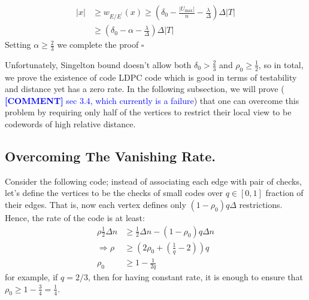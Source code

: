 \documentclass{article}
\newcommand{\commentt}[1]{\textcolor{blue}{ \textbf{[COMMENT]} #1}}
\newcommand{\ctt}[1]{\commentt{#1}}
\begin{document}
\begin{multicols*}{2}
  \begin{equation*}
    \begin{split}
      |x| & \ge  w_{E/E^{\prime}}\left( x \right)  \ge \left( \delta_{0} - \frac{|U_{\max}|}{n} - \frac{\lambda}{\Delta} \right) \Delta|T| \\ 
      & \ge \left( \delta_{0} - \alpha - \frac{\lambda}{\Delta} \right) \Delta|T| 
    \end{split}
  \end{equation*}
  Setting $\alpha \ge \frac{2}{3}$ we complete the proof $\square$

  Unfortunately, Singelton bound doesn't allow both $\delta_0 > \frac{2}{3}$ and $\rho_0 \ge \frac{1}{2}$, so in total, we prove the existence of code LDPC code which is good in terms of testability and distance yet has a zero rate. In the following subsection, we will prove (\ctt{sec 3.4, which currently is a failure}) that one can overcome this problem by requiring only half of the vertices to restrict their local view to be codewords of high relative distance. 


  \subsection { Overcoming The Vanishing Rate. } 
  Consider the following code; instead of associating each edge with pair of checks, let's define the vertices to be the checks of small codes over $q \in [0,1]$ fraction of their edges. That is, now each vertex defines only $\left( 1 - \rho_{0} \right)q\Delta$ restrictions. Hence, the rate of the code is at least:   
  \begin{equation*}
    \begin{split}
      \rho\frac{1}{2}\Delta n & \ge \frac{1}{2}\Delta n - \left(1 - \rho_{0} \right)q\Delta n \\
      \Rightarrow \rho & \ge \left(  2\rho_{0} + \left( \frac{1}{q}  - 2  \right)  \right)q \\ 
      \rho_{0} & \ge  1 - \frac{1}{2q} 
    \end{split}
  \end{equation*} for example, if $q = 2/3$, then for having constant rate, it is enough to ensure that $ \rho_{0} \ge 1 - \frac{3}{4} = \frac{1}{4}$.


\end{multicols*}
\end{document}
